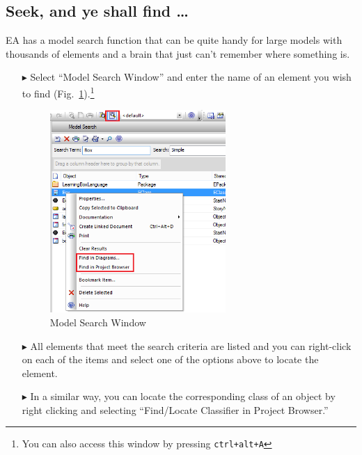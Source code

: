 \newpage

\hypertarget{subsec:seekAndFind}{}

\subsection{Seek, and ye shall find \ldots}

EA has a model search function that can be quite handy for large models with thousands of elements and a brain that just can't remember where something is. 

\begin{enumerate}

\item[$\blacktriangleright$]Select ``Model Search Window'' and enter the name of an element you wish to find (Fig.~\ref{fig_search01}).\footnote{You can also
access this window by pressing \texttt{ctrl+alt+A}} 

\begin{figure}[htbp]
\begin{center}
  \includegraphics[width=0.63\textwidth]{search1}
  \caption{Model Search Window}  
  \label{fig_search01}
\end{center}
\end{figure}

\item[$\blacktriangleright$] All elements that meet the search criteria are listed and you can right-click on each of the items and select one of the options
above to locate the element.

\item[$\blacktriangleright$] In a similar way, you can locate the corresponding class of an object by right clicking and selecting ``Find/Locate Classifier in
Project Browser.''

\end{enumerate}
